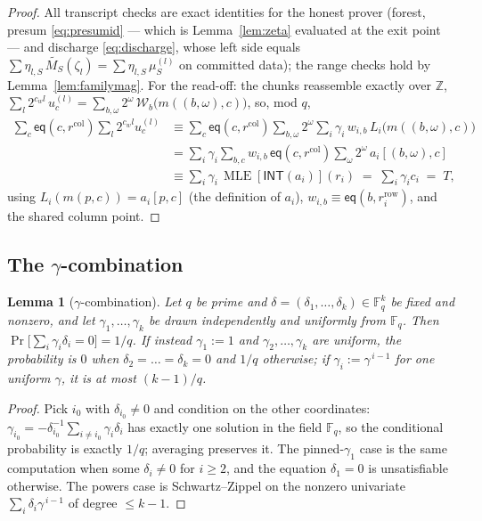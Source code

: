 \documentclass[11pt]{article}
\newcommand{\F}{\mathbb{F}}
\newcommand{\Z}{\mathbb{Z}}
\newcommand{\Fq}{\F_q}                 %
\newcommand{\INT}{\mathsf{INT}}
\newcommand{\mle}[1]{\widetilde{#1}}
\newcommand{\eq}{\mathsf{eq}}
\newcommand{\cw}{c_w}
\newcommand{\Wc}{\mathcal{W}}          %
\DeclareMathOperator{\MLE}{MLE}
\theoremstyle{plain}
\newtheorem{lemma}[theorem]{Lemma}
\theoremstyle{definition}
\theoremstyle{remark}
\begin{document}
\begin{proof}
All transcript checks are exact identities for the honest prover (forest,
presum \eqref{eq:presumid} --- which is Lemma~\ref{lem:zeta} evaluated at the
exit point --- and discharge \eqref{eq:discharge}, whose left side equals
$\sum\eta_{l,S}\,\mle{M_S}(\zeta_l)=\sum\eta_{l,S}\,\mu^{(l)}_S$ on committed
data); the range checks hold by Lemma~\ref{lem:familymag}. For the read-off:
the chunks reassemble exactly over $\Z$,
$\sum_{l}2^{\cw l}\,u^{(l)}_c
 = \sum_{b,\omega}2^{\omega}\,\Wc_b\bigl(m((b,\omega),c)\bigr)$,
so, mod $q$,
\begin{align*}
  \sum_{c}\eq(c,r^{\mathrm{col}})\sum_{l}2^{\cw l}u^{(l)}_c
  &\equiv \sum_{c}\eq(c,r^{\mathrm{col}})\sum_{b,\omega}2^{\omega}
     \sum_i \gamma_i\,w_{i,b}\,L_i\bigl(m((b,\omega),c)\bigr) \\
  &= \sum_i \gamma_i \sum_{b,c} w_{i,b}\,\eq(c,r^{\mathrm{col}})
     \sum_{\omega}2^{\omega}\, a_i[(b,\omega),c] \\
  &\equiv \sum_i \gamma_i\,\MLE[\INT(a_i)](r_i)
   \;=\; \sum_i\gamma_i c_i \;=\; T,
\end{align*}
using $L_i(m(p,c))=a_i[p,c]$ (the definition of $a_i$),
$w_{i,b}\equiv\eq(b,r^{\mathrm{row}}_i)$, and the shared column point.
\end{proof}

\subsection{The \texorpdfstring{$\gamma$}{gamma}-combination}

\begin{lemma}[$\gamma$-combination]\label{lem:gamma}
Let $q$ be prime and $\delta=(\delta_1,\dots,\delta_k)\in\Fq^{k}$ be fixed and
nonzero, and let $\gamma_1,\dots,\gamma_k$ be drawn independently and
uniformly from $\Fq$. Then
$\Pr\bigl[\sum_i\gamma_i\delta_i = 0\bigr] = 1/q$. If instead $\gamma_1:=1$
and $\gamma_2,\dots,\gamma_k$ are uniform, the probability is $0$ when
$\delta_2=\dots=\delta_k=0$ and $1/q$ otherwise; if
$\gamma_i:=\gamma^{\,i-1}$ for one uniform $\gamma$, it is at most
$(k-1)/q$.
\end{lemma}

\begin{proof}
Pick $i_0$ with $\delta_{i_0}\ne 0$ and condition on the other coordinates:
$\gamma_{i_0}=-\delta_{i_0}^{-1}\sum_{i\ne i_0}\gamma_i\delta_i$ has exactly
one solution in the field $\Fq$, so the conditional probability is exactly
$1/q$; averaging preserves it. The pinned-$\gamma_1$ case is the same
computation when some $\delta_i\ne0$ for $i\ge2$, and the equation
$\delta_1=0$ is unsatisfiable otherwise. The powers case is
Schwartz--Zippel on the nonzero univariate
$\sum_i\delta_i\gamma^{\,i-1}$ of degree $\le k-1$.
\end{proof}
\end{document}

